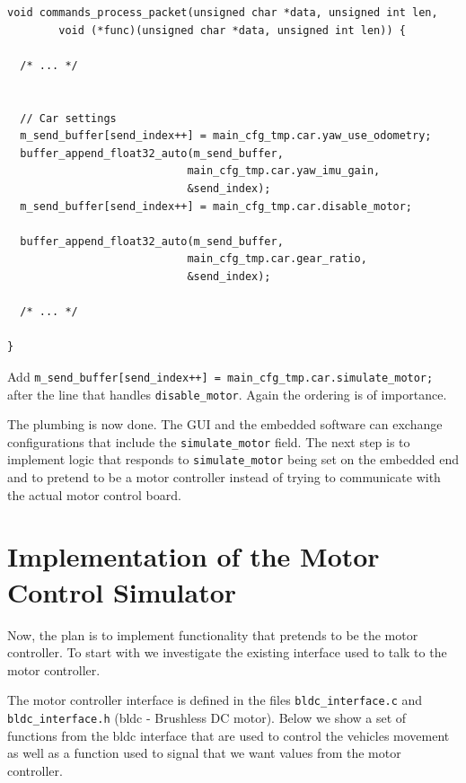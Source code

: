 \documentclass[12pt]{article} %
\newcommand{\change}[0]{\noindent{\hl {\b CODE CHANGE:}}}
\begin{document}
\begin{Verbatim}[samepage=true,frame=single,label=Embedded/RC\_Controller/commands.c]
void commands_process_packet(unsigned char *data, unsigned int len,
		void (*func)(unsigned char *data, unsigned int len)) {

  /* ... */ 
                  
                  
  // Car settings
  m_send_buffer[send_index++] = main_cfg_tmp.car.yaw_use_odometry;
  buffer_append_float32_auto(m_send_buffer,
                            main_cfg_tmp.car.yaw_imu_gain,
                            &send_index);
  m_send_buffer[send_index++] = main_cfg_tmp.car.disable_motor;

  buffer_append_float32_auto(m_send_buffer,
                            main_cfg_tmp.car.gear_ratio,
                            &send_index);
                  
  /* ... */ 
  
}
\end{Verbatim}

\change{} Add
       {\verb!m_send_buffer[send_index++] = main_cfg_tmp.car.simulate_motor;!}
       after the line that handles {\verb!disable_motor!}. Again the
       ordering is of importance.


The plumbing is now done. The GUI and the embedded software can
exchange configurations that include the {\verb!simulate_motor!}
field.  The next step is to implement logic that responds to
{\verb!simulate_motor!} being set on the embedded end and to pretend
to be a motor controller instead of trying to communicate with the
actual motor control board.
       
      
\section{Implementation of the Motor Control Simulator} \label{sec:implementation}

Now, the plan is to implement functionality that pretends to be the
motor controller. To start with we investigate the existing interface
used to talk to the motor controller.

The motor controller interface is defined in the files
{\verb!bldc_interface.c!} and {\verb!bldc_interface.h!} (bldc -
Brushless DC motor).  Below we show a set of functions from the bldc
interface that are used to control the vehicles movement as well as a
function used to signal that we want values from the motor controller.

\end{document}
